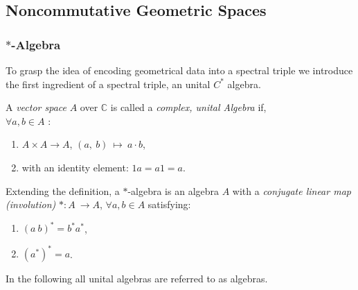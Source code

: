 \subsection{Noncommutative Geometric Spaces}
\subsubsection{$*$-Algebra}
To grasp the idea of encoding geometrical data into a spectral triple we
introduce the first ingredient of a spectral triple, an unital $C^*$ algebra.
\begin{definition}
    A \textit{vector space} $A$ over $\mathbb{C}$ is called a \textit{complex, unital Algebra} if, \\
    $\forall a,b \in A$ :
    \begin{enumerate}
        \item
            $A \times A \rightarrow A$,
            $(a,\ b)\ \mapsto \ a\cdot b$,
        \item with an identity element:
            $1a = a1 =a$.
    \end{enumerate}
    Extending the definition, a $*$-algebra is an algebra $A$ with a \textit{conjugate linear map (involution)} $*:A\ \rightarrow  A$,
    $\forall a, b \in A$ satisfying:
    \begin{enumerate}
        \item
            $(a\ b)^* = b^*a^*$,
        \item
            $(a^*)^* = a$.
    \end{enumerate}
\end{definition}
In the following all unital algebras are referred to as algebras.

